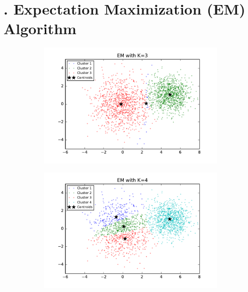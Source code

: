 \section*{\Large {}. Expectation Maximization (EM) Algorithm}

\begin{figure}[htb]
        \centering
        \begin{subfigure}[b]{0.475\textwidth}
            \centering
            \includegraphics[width=\textwidth]{./figures/clustering_EM_3.pdf}
        \end{subfigure}
        \hfill
        \begin{subfigure}[b]{0.475\textwidth}  
            \centering 
            \includegraphics[width=\textwidth]{./figures/clustering_EM_4.pdf}

\end{subfigure}
\end{figure}
